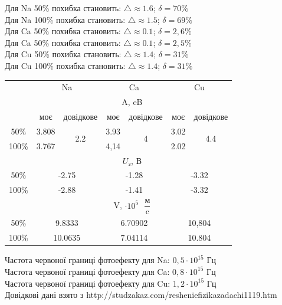 \documentclass[a4paper,14pt]{extreport}
\begin{document}
	Для Na 50\% похибка становить: $\triangle \approx 1.6$; $\delta = 70\%$\\
	Для Na 100\% похибка становить: $\triangle \approx 1.5$; $\delta = 69\%$\\

	Для Ca 50\% похибка становить: $\triangle \approx 0.1$; $\delta = 2,6\%$\\
	Для Ca 50\% похибка становить: $\triangle \approx 0.1$; $\delta = 2,5\%$\\

	Для Cu 50\% похибка становить: $\triangle \approx 1.4$; $\delta = 31\%$\\
	Для Cu 100\% похибка становить: $\triangle \approx 1.4$; $\delta = 31\%$\\
	
	
	\begin{table}[h]
	\begin{small}
	\begin{tabular}{|c|c|c|c|c|c|c|}
	\hline
	\multicolumn{1}{|l|}{\multirow{3}{*}{}} & \multicolumn{2}{c|}{Na} & \multicolumn{2}{c|}{Ca} & \multicolumn{2}{c|}{Cu} \\ \cline{2-7} 
	\multicolumn{1}{|l|}{} & \multicolumn{6}{c|}{A, eB} \\ \cline{2-7} 
	\multicolumn{1}{|l|}{} & моє & довідкове & моє & довідкове & моє & довідкове \\ \hline
	50\% & 3.808 & \multirow{2}{*}{2.2} & 3.93 & \multirow{2}{*}{4} & 3.02 & \multirow{2}{*}{4.4} \\ \cline{1-2} \cline{4-4} \cline{6-6}
	100\% & 3.767 &  & 4,14 &  & 2.02 &  \\ \hline
	\multicolumn{1}{|l|}{} & \multicolumn{6}{c|}{$U_{\text{з}}$,  В} \\ \hline
	50\% & \multicolumn{2}{c|}{-2.75} & \multicolumn{2}{c|}{-1.28} & \multicolumn{2}{c|}{-3.32} \\ \hline
	100\% & \multicolumn{2}{c|}{-2.88} & \multicolumn{2}{c|}{-1.41} & \multicolumn{2}{c|}{-3.32} \\ \hline
	\multicolumn{1}{|l|}{} & \multicolumn{6}{c|}{V,  $\cdot 10^{5}  \text{ }\dfrac{\text{м}}{\text{c}}$} \\ \hline
	50\% & \multicolumn{2}{c|}{9.8333} & \multicolumn{2}{c|}{6.70902} & \multicolumn{2}{c|}{10,804} \\ \hline
	100\% & \multicolumn{2}{c|}{10.0635} & \multicolumn{2}{c|}{7.04114} & \multicolumn{2}{c|}{10.804} \\ \hline
	\end{tabular}	
		\end{small}
	\end{table}
	Частота червоної границі фотоефекту для Na: $ 0,5 \cdot 10^{15} $ Гц\\
	Частота червоної границі фотоефекту для Ca: $ 0,8 \cdot 10^{15} $ Гц\\
	Частота червоної границі фотоефекту для Cu: $ 1,2 \cdot 10^{15} $ Гц\\
	Довідкові дані взято з http://studzakaz.com/resheniefizikazadachi1119.htm
 
\end{document}
